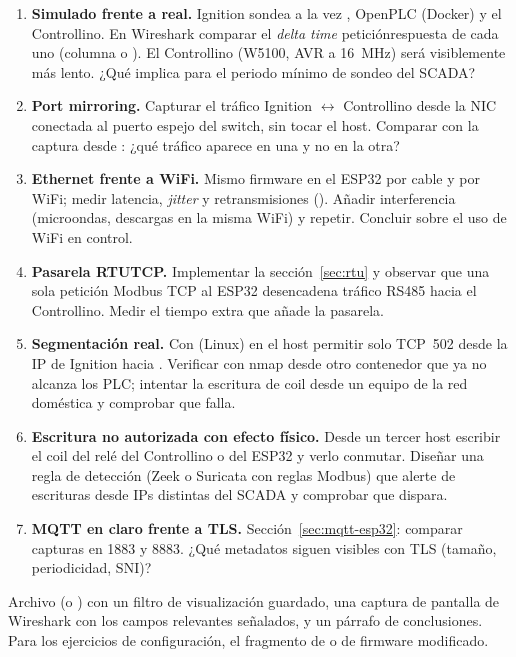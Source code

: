 \begin{enumerate}[label=\textbf{E\arabic*.},leftmargin=*,itemsep=4pt,resume]
  \item \textbf{Simulado frente a real.} Ignition sondea a la vez , OpenPLC (Docker) y el Controllino. En Wireshark comparar el \emph{delta time} petición\ra{}respuesta de cada uno (columna  o ). El Controllino (W5100, AVR a 16~MHz) será visiblemente más lento. ¿Qué implica para el periodo mínimo de sondeo del SCADA?
  \item \textbf{Port mirroring.} Capturar el tráfico Ignition $\leftrightarrow$ Controllino desde la NIC conectada al puerto espejo del switch, sin tocar el host. Comparar con la captura desde : ¿qué tráfico aparece en una y no en la otra?
  \item \textbf{Ethernet frente a WiFi.} Mismo firmware en el ESP32 por cable y por WiFi; medir latencia, \emph{jitter} y retransmisiones (). Añadir interferencia (microondas, descargas en la misma WiFi) y repetir. Concluir sobre el uso de WiFi en control.
  \item \textbf{Pasarela RTU\ra{}TCP.} Implementar la sección~\ref{sec:rtu} y observar que una sola petición Modbus TCP al ESP32 desencadena tráfico RS485 hacia el Controllino. Medir el tiempo extra que añade la pasarela.
  \item \textbf{Segmentación real.} Con  (Linux) en el host permitir solo TCP~502 desde la IP de Ignition hacia . Verificar con nmap desde otro contenedor que ya no alcanza los PLC; intentar la escritura de coil desde un equipo de la red doméstica y comprobar que falla.
  \item \textbf{Escritura no autorizada con efecto físico.} Desde un tercer host escribir el coil del relé del Controllino o del ESP32 y verlo conmutar. Diseñar una regla de detección (Zeek o Suricata con reglas Modbus) que alerte de escrituras desde IPs distintas del SCADA y comprobar que dispara.
  \item \textbf{MQTT en claro frente a TLS.} Sección~\ref{sec:mqtt-esp32}: comparar capturas en 1883 y 8883. ¿Qué metadatos siguen visibles con TLS (tamaño, periodicidad, SNI)?
\end{enumerate}

\begin{nota}
Archivo  (o ) con un filtro de visualización guardado, una captura de pantalla de Wireshark con los campos relevantes señalados, y un párrafo de conclusiones. Para los ejercicios de configuración, el fragmento de  o de firmware modificado.
\end{nota}
